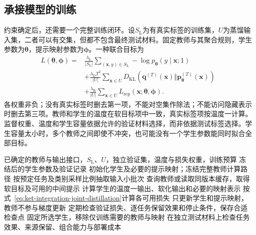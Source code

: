\subsection{承接模型的训练}
\label{sec:ket-integration-student-training}

约束确定后，还需要一个完整训练闭环。设$S_{\mathrm{L}}$为有真实标签的训练集，$U$为蒸馏输入集，二者可以有交集，但都不包含最终测试材料。固定教师与其聚合规则，学生参数为$\bm{\theta}$，提示映射参数为$\bm{\phi}$。一种联合目标为
\begin{equation}
  \begin{aligned}
    L(\bm{\theta},\bm{\phi})={}&
      \frac{\lambda_{\mathrm{L}}}{|S_{\mathrm{L}}|}
      \sum_{(\bm{x},y)\in S_{\mathrm{L}}}
        -\log p_{\bm{\theta}}(y\mid\bm{x};1)\\
      &+\frac{\lambda_{\mathrm{D}}T^2}{|U|}
      \sum_{\bm{x}\in U}
        D_{\mathrm{KL}}\!\left(
          \bm{q}^{(T)}(\bm{x})\Vert
          \bm{p}_{\bm{\theta}}^{(T)}(\bm{x})\right)\\
      &+\frac{\lambda_{\mathrm{R}}}{|U|}
      \sum_{\bm{x}\in U}L_{\mathrm{rep}}(\bm{x};\bm{\theta},\bm{\phi}).
  \end{aligned}
  \label{eq:ket-integration-joint-distillation}
\end{equation}
各权重非负；没有真实标签时删去第一项，不能对空集作除法；不能访问隐藏表示时删去第三项。教师和学生的温度在软目标项中一致，真实标签项按温度一计算。监督权重、温度和学生容量依据允许的验证材料选择，而非依据测试标签选择。学生容量太小时，多个教师之间即使不冲突，也可能没有一个学生参数能同时拟合全部目标。

\begin{algorithm}[从冻结教师到可部署学生]
  \label{alg:ket-integration-distillation-loop}
  \begin{algorithmic}[1]
    \Require 已确定的教师与输出接口，$S_{\mathrm{L}}$、$U$，独立验证集，温度与损失权重，训练预算
    \Ensure 冻结后的学生参数及验证记录
    \State 初始化学生及必要的提示映射；冻结完整教师计算路径
      \State 按预定任务及类别采样比例抽取输入小批次
      \State 查询教师或读取同版本缓存，取得软目标及可用的中间提示
      \State 计算学生的温度一输出、软化输出和必要的映射表示
      \State 按式~\eqref{eq:ket-integration-joint-distillation}计算各可用损失
      \State 只更新学生和提示映射，教师不参与梯度更新
      \State 定期检查验证损失、逐任务保留效果和停止条件，保存合适检查点
    \EndFor
    \State 固定所选学生，移除仅训练需要的教师与映射
    \State 在独立测试材料上检查任务效果、来源保留、组合能力与部署成本
  \end{algorithmic}
\end{algorithm}

